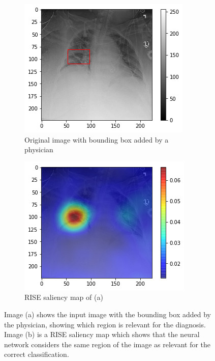 \begin{figure}[H]
    \centering
    \begin{subfigure}[t]{.45\textwidth}
        \centering
        \includegraphics[width=\linewidth]{chapters/03_classification/images/rise0_bbox.png}
        \caption{Original image with bounding box added by a physician}
    \end{subfigure}\hspace{1cm}%
    \begin{subfigure}[t]{.45\textwidth}
        \centering
        \includegraphics[width=\linewidth]{chapters/03_classification/images/rise0_saliency.png}
        \caption{RISE saliency map of (a)}
    \end{subfigure}
    \caption{Image (a) shows the input image with the bounding box added by the physician, showing which region is relevant for the diagnosis. Image (b) is a RISE saliency map which shows that the neural network considers the same region of the image as relevant for the correct classification.}
    \label{rise_example_1}
\end{figure}

